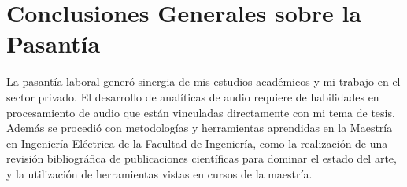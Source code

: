 \documentclass{article}
\begin{document}

\section{Conclusiones Generales sobre la Pasantía}
\label{concl}
La pasantía laboral generó sinergia de mis estudios académicos y mi trabajo en el sector privado. El desarrollo de analíticas de audio requiere de habilidades en procesamiento de audio que están vinculadas directamente con mi tema de tesis. Además se procedió con metodologías y herramientas aprendidas en la Maestría en Ingeniería Eléctrica de la Facultad de Ingeniería, como la realización de una revisión bibliográfica de publicaciones científicas para dominar el estado del arte, y la utilización de herramientas vistas en cursos de la maestría.






\newpage



\end{document}
